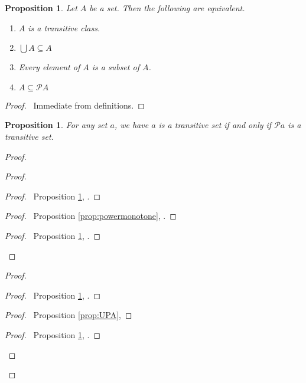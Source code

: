 \documentclass{book}
\let\qed\relax
\newtheorem{prop}[ax]{Proposition}
\theoremstyle{definition}
\begin{document}
\begin{prop}
\label{prop:transitiveset}
Let $A$ be a set. Then the following are equivalent.
\begin{enumerate}
\item
$A$ is a transitive class.
\item
$\bigcup A \subseteq A$
\item
Every element of $A$ is a subset of $A$.
\item
$A \subseteq \mathcal{P} A$
\end{enumerate}
\end{prop}

\begin{proof}
\pf\ Immediate from definitions. \qed
\end{proof}

\begin{prop}
For any set $a$, we have $a$ is a transitive set if and only if $\mathcal{P} a$ is a transitive set.
\end{prop}

\begin{proof}
\pf
{}
\begin{proof}
	\begin{proof}
		\pf\ Proposition \ref{prop:transitiveset}, .
	\end{proof}
	\begin{proof}
		\pf\ Proposition \ref{prop:powermonotone}, .
	\end{proof}
	\begin{proof}
		\pf\ Proposition \ref{prop:transitiveset}, .
	\end{proof}
\end{proof}
\begin{proof}
	\begin{proof}
		\pf\ Proposition \ref{prop:transitiveset}, .
	\end{proof}
	\begin{proof}
		\pf\ Proposition \ref{prop:UPA}, 
	\end{proof}
	\begin{proof}
		\pf\ Proposition \ref{prop:transitiveset}, .
	\end{proof}
\end{proof}
\qed
\end{proof}
\end{document}
